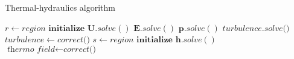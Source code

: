 \documentclass{article}
\makeatletter
\def\BState{\State\hskip-\ALG@thistlm}
\makeatother
\begin{document}
\begin{algorithm}
\caption{Thermal-hydraulics algorithm}\label{euclid}
\begin{algorithmic}[1]
  \State $r \gets \textit{region } \textbf{initialize}$
  \State $\textbf{U}.solve()$
  \State $\textbf{E}.solve()$
  \State $\textbf{p}.solve()$
  \State $turbulence.\textit{solve()}$
  \State $turbulence \gets \textit{correct()}$
  \EndFor
  \State $s \gets \textit{region } \textbf{initialize}$
  \State $\textbf{h}.solve()$
  \State $\textit{thermo field} \gets \textit{correct()}$
  \EndFor
  \EndWhile
\end{algorithmic}
\end{algorithm}
\end{document}
